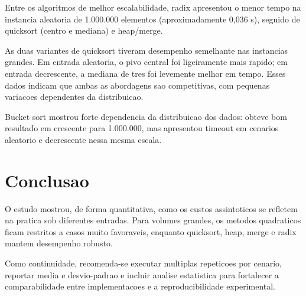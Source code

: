 \documentclass[12pt]{article}
\begin{document}
Entre os algoritmos de melhor escalabilidade, radix apresentou o menor tempo
na instancia aleatoria de 1.000.000 elementos (aproximadamente 0,036 s),
seguido de quicksort (centro e mediana) e heap/merge.

As duas variantes de quicksort tiveram desempenho semelhante nas instancias grandes.
Em entrada aleatoria, o pivo central foi ligeiramente mais rapido; em entrada
decrescente, a mediana de tres foi levemente melhor em tempo.
Esses dados indicam que ambas as abordagens sao competitivas, com pequenas variacoes
dependentes da distribuicao.

Bucket sort mostrou forte dependencia da distribuicao dos dados:
obteve bom resultado em crescente para 1.000.000, mas apresentou timeout em cenarios
aleatorio e decrescente nessa mesma escala.

\section{Conclusao}
O estudo mostrou, de forma quantitativa, como os custos assintoticos se refletem
na pratica sob diferentes entradas. Para volumes grandes, os metodos quadraticos
ficam restritos a casos muito favoraveis, enquanto quicksort, heap, merge e radix
mantem desempenho robusto.

Como continuidade, recomenda-se executar multiplas repeticoes por cenario,
reportar media e desvio-padrao e incluir analise estatistica para fortalecer
a comparabilidade entre implementacoes e a reproducibilidade experimental.
\end{document}
